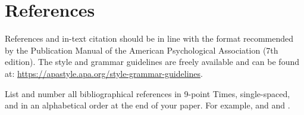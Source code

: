 \documentclass[10pt]{article}
\begin{document}
\section{References} 

References and in-text citation should be in line with the format recommended by the Publication Manual of the American Psychological Association (7th edition). The style and grammar guidelines are freely available and can be found at:  \url{https://apastyle.apa.org/style-grammar-guidelines}.

List and number all bibliographical references in 9-point Times, single-spaced, and in an alphabetical order at the end of your paper. For example, \cite{Castells2010, Allen1997} and \cite{Bloomberg2018} and \cite{Allen1997}.


% 
% 

\printbibliography
\end{document}
